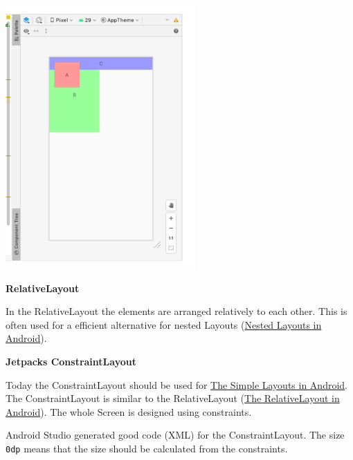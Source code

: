 \documentclass[11pt,twoside,landscape]{article}
\begin{document}
\begin{multicols}{3}
\begin{center}
\includegraphics[width=.9\linewidth]{img/framelayout.png}
\end{center}

\textbf{RelativeLayout}

In the RelativeLayout the elements are arranged relatively to each other.
This is often used for a efficient alternative for nested Layouts (\href{../../../roam/20211017141728-nested_layouts_in_android.org}{Nested Layouts in Android}).

\textbf{Jetpacks ConstraintLayout}

Today the ConstraintLayout should be used for \href{../../../roam/20211017133750-the_simple_layouts_in_android.org}{The Simple Layouts in Android}.
The ConstraintLayout is similar to the RelativeLayout (\href{../../../roam/20211017135008-the_relativelayout_in_android.org}{The RelativeLayout in Android}).
The whole Screen is designed using constraints.

Android Studio generated good code (XML) for the ConstraintLayout.
The size \texttt{0dp} means that the size should be calculated from the constraints.


\end{multicols}
\end{document}
